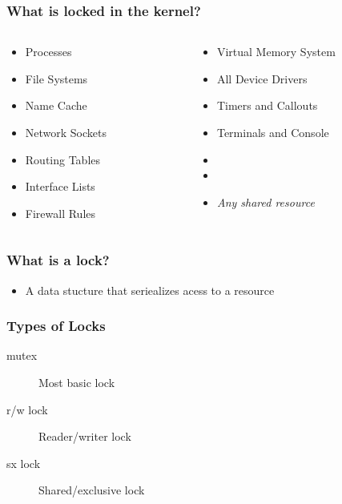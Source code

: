 \documentclass[pdftex]{beamer} %
\begin{document}
\begin{frame}[fragile]
  \frametitle{What is locked in the kernel?}
  \begin{columns}[t]
    \begin{column}{5cm}
      \begin{itemize}
      \item Processes
      \item File Systems
      \item Name Cache
      \item Network Sockets
      \item Routing Tables
      \item Interface Lists
      \item Firewall Rules
      \end{itemize}
    \end{column}
    \begin{column}{5cm}
      \begin{itemize}
      \item Virtual Memory System
      \item All Device Drivers
      \item Timers and Callouts
      \item Terminals and Console
      \item 
      \item 
      \item \emph{Any shared resource}
      \end{itemize}
    \end{column}
  \end{columns}
\end{frame}

\begin{frame}
  \frametitle{What is a lock?}
  \begin{itemize}
  \item A data stucture that seriealizes acess to a resource
  \end{itemize}
\end{frame}

\begin{frame}
  \frametitle{Types of Locks}
  \begin{description}
  \item[mutex] Most basic lock
  \item[r/w lock] Reader/writer lock
  \item[sx lock] Shared/exclusive lock
  \end{description}
\end{frame}
\end{document}
